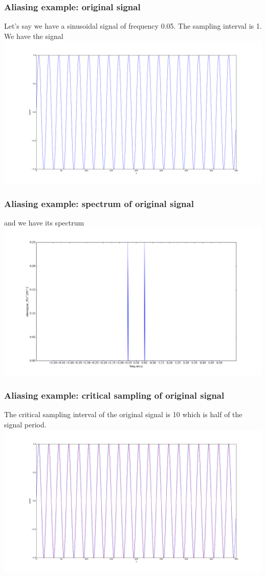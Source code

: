 \documentclass{beamer}
\begin{document}
\begin{frame}
\frametitle{Aliasing example: original signal}
Let's say we have a sinusoidal signal of frequency 0.05. The sampling interval is 1. We have the signal
\includegraphics[scale=0.2]{aliasing_original_signal.png}
\end{frame}
\begin{frame}
\frametitle{Aliasing example: spectrum of original signal}
and we have its spectrum
\includegraphics[scale=0.3]{aliasing_original_dft.png}
\end{frame}
\begin{frame}
\frametitle{Aliasing example: critical sampling of original signal}
The critical sampling interval of the original signal is 10 which is half of the signal period.
\includegraphics[scale=0.2]{worst_sample.png}
\end{frame}
\end{document}
